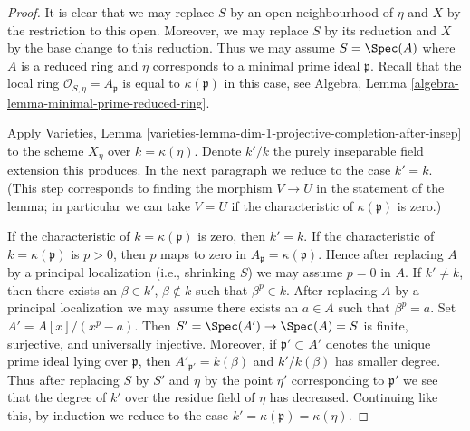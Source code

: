 \begin{proof}
It is clear that we may replace $S$ by an open neighbourhood of $\eta$
and $X$ by the restriction to this open.
Moreover, we may replace $S$ by its reduction and $X$ by
the base change to this reduction.
Thus we may assume $S = \Spec(A)$ where $A$ is a reduced ring
and $\eta$ corresponds to a minimal prime ideal $\mathfrak p$.
Recall that the local ring $\mathcal{O}_{S, \eta} = A_\mathfrak p$
is equal to $\kappa(\mathfrak p)$ in this case, see
Algebra, Lemma \ref{algebra-lemma-minimal-prime-reduced-ring}.

\medskip\noindent
Apply Varieties, Lemma
\ref{varieties-lemma-dim-1-projective-completion-after-insep}
to the scheme $X_\eta$ over $k = \kappa(\eta)$.
Denote $k'/k$ the purely inseparable field extension this produces.
In the next paragraph we reduce to the case $k' = k$.
(This step corresponds to finding the morphism $V \to U$ in
the statement of the lemma; in particular we can take $V = U$
if the characteristic of $\kappa(\mathfrak p)$ is zero.)

\medskip\noindent
If the characteristic of $k = \kappa(\mathfrak p)$ is zero, then
$k' = k$. If the characteristic of $k = \kappa(\mathfrak p)$
is $p > 0$, then $p$ maps to zero in $A_\mathfrak p = \kappa(\mathfrak p)$.
Hence after replacing $A$ by a principal localization (i.e.,
shrinking $S$) we may assume $p = 0$ in $A$. If $k' \not = k$, then
there exists an $\beta \in k'$, $\beta \not \in k$
such that $\beta^p \in k$. After replacing $A$ by a principal
localization we may assume there exists an $a \in A$ such
that $\beta^p = a$. Set $A' = A[x]/(x^p - a)$.
Then $S' = \Spec(A') \to \Spec(A) = S$ is finite, surjective, and
universally injective. Moreover, if $\mathfrak p' \subset A'$
denotes the unique prime ideal lying over $\mathfrak p$,
then $A'_{\mathfrak p'} = k(\beta)$ and $k'/k(\beta)$
has smaller degree. Thus after replacing $S$ by $S'$
and $\eta$ by the point $\eta'$ corresponding to $\mathfrak p'$
we see that the degree of $k'$ over the residue field of $\eta$
has decreased. Continuing like this, by induction we reduce
to the case $k' = \kappa(\mathfrak p) = \kappa(\eta)$.


\end{proof}
